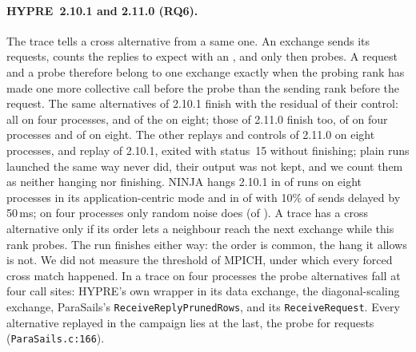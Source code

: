 \paragraph{HYPRE~2.10.1 and 2.11.0 (RQ6).} The trace tells a cross alternative from a same
one. An exchange sends its requests, counts the replies to expect with an ,
and only then probes. A request and a probe therefore belong to one exchange exactly when the
probing rank has made one more collective call before the probe than the sending rank before
the request. The same alternatives of 2.10.1 finish with the residual of their control: all
\nHypreFourLocalAlts on four processes, and \nHypreEightLocalSameResidual of the
\nHypreEightLocalAlts on eight; those of 2.11.0 finish too, \nHypreFixedFourLocalFinish of
\nHypreFixedFourLocalAlts on four processes and \nHypreFixedEightLocalFinish of
\nHypreFixedEightLocalAlts on eight. The other \nHypreFixedEightLocalOther replays and
\nHypreFixedEightLocalControlsFailed controls of 2.11.0 on eight processes, and
\nHypreEightLocalOther replay of 2.10.1, exited with status~15 without finishing; plain runs
launched the same way never did, their output was not kept, and we count them as neither
hanging nor finishing. NINJA hangs 2.10.1 in \nNinjaHypreEightAppHangSetup of
\nNinjaHypreEightAppRuns runs on eight processes in its application-centric mode and in
\nNinjaHypreEightRandomShortHangSetup of \nNinjaHypreEightRandomShortRuns with 10\% of sends
delayed by 50\,ms; on four processes only random noise does
(\nNinjaHypreFourRandomShortHangSetup of \nNinjaHypreFourRandomShortRuns). A trace has a cross alternative only if its order lets a neighbour reach
the next exchange while this rank probes. The run finishes either way: the order is common, the
hang it allows is not. We did not measure the threshold of MPICH, under which every forced cross
match happened. In a trace on four processes the probe alternatives fall at four call sites:
HYPRE's own  wrapper in its data exchange, the diagonal-scaling exchange,
ParaSails's \texttt{ReceiveReplyPrunedRows}, and its \texttt{ReceiveRequest}. Every alternative
replayed in the campaign lies at the last, the probe for requests (\texttt{ParaSails.c:166}).

